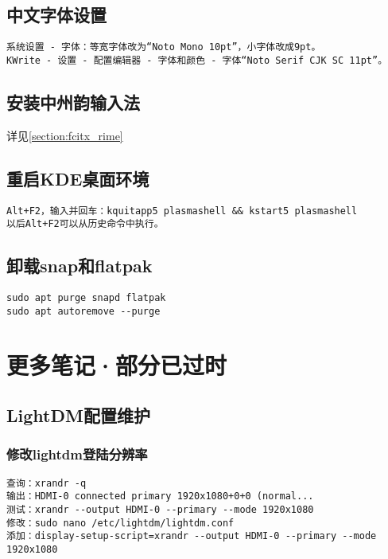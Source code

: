 \documentclass[a4paper,fontset=fandol,zihao=-4,linespread=1.2,oneside]{ctexbook}
\begin{document}
\section{中文字体设置}
\begin{lstlisting}
系统设置 - 字体：等宽字体改为“Noto Mono 10pt”，小字体改成9pt。
KWrite - 设置 - 配置编辑器 - 字体和颜色 - 字体“Noto Serif CJK SC 11pt”。
\end{lstlisting}

\section{安装中州韵输入法}
详见\ref{section:fcitx_rime}

\section{重启KDE桌面环境}
\begin{lstlisting}
Alt+F2，输入并回车：kquitapp5 plasmashell && kstart5 plasmashell
以后Alt+F2可以从历史命令中执行。
\end{lstlisting}

\section{卸载snap和flatpak}
\begin{lstlisting}
sudo apt purge snapd flatpak
sudo apt autoremove --purge
\end{lstlisting}


\chapter{更多笔记·部分已过时}

\section{LightDM配置维护}

\subsection{修改lightdm登陆分辨率}
\begin{lstlisting}
查询：xrandr -q
输出：HDMI-0 connected primary 1920x1080+0+0 (normal...
测试：xrandr --output HDMI-0 --primary --mode 1920x1080
修改：sudo nano /etc/lightdm/lightdm.conf
添加：display-setup-script=xrandr --output HDMI-0 --primary --mode 1920x1080
\end{lstlisting}
\end{document}
